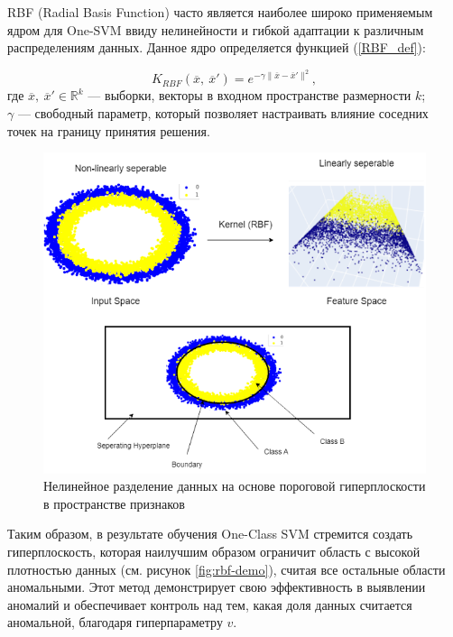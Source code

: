 RBF (Radial Basis Function) \cite{RBF-Kernel-in-SVM} часто является наиболее широко применяемым ядром для One-SVM ввиду нелинейности и гибкой адаптации к различным распределениям данных. Данное ядро определяется функцией (\ref{RBF_def}):

\begin{equation}\label{RBF_def}
    K_{RBF}(\overline{x},\ \overline{x}') = e^{-\gamma \lVert \overline{x} - \overline{x}' \rVert^2},
\end{equation}
где $\overline{x},\ \overline{x}' \in \mathbb{R}^k$ --- выборки, векторы в входном пространстве размерности $k$; \\
$\gamma$ --- свободный параметр, который позволяет настраивать влияние соседних точек на границу принятия решения.

\begin{figure}
  \centering
  \includegraphics[scale=0.45]{inc/images/nonlinear-separation-demo.png}
  \caption{Нелинейное разделение данных на основе пороговой гиперплоскости в пространстве признаков \cite{RBF-Kernel-in-SVM}}
  \label{fig:nonlinear-separation-demo}
\end{figure}

Таким образом, в результате обучения One-Class SVM стремится создать гиперплоскость, которая наилучшим образом ограничит область с высокой плотностью данных (см. рисунок \ref{fig:rbf-demo}), считая все остальные области аномальными. Этот метод демонстрирует свою эффективность в выявлении аномалий и обеспечивает контроль над тем, какая доля данных считается аномальной, благодаря гиперпараметру $v$.

